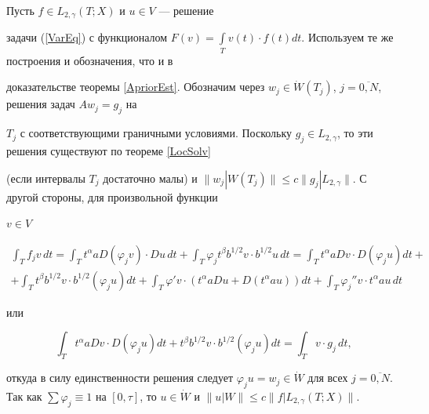 \begin{pf}


Пусть $f \in L_{2,\gamma}(T;X)$ и $u \in V$ --- решение


задачи (\ref{VarEq}) с функционалом $F(v)=\int\limits_T v(t) \cdot


f(t) dt$. Используем те же построения и обозначения, что и в


доказательстве теоремы \ref{ApriorEst}. Обозначим через $w_j \in


\dot{W}(T_j)$, $j=\overline{0,N}$, решения задач $A w_j=g_j$ на


$T_j$ с соответствующими граничными условиями. Поскольку $g_j \in


L_{2,\gamma}$, то эти решения существуют по теореме \ref{LocSolv}


(если интервалы $T_j$ достаточно малы) и $\|w_j|W(T_j)\| \le c


\|g_j|L_{2,\gamma}\|$. С другой стороны, для произвольной функции


$v \in V$


\begin{multline*}


\int_T f_j v\,dt = \int_T t^\alpha a D(\varphi_j v) \cdot Du\,dt  +


\int_T \varphi_j t^\beta b^{1/2} v \cdot b^{1/2} u\,dt


= \int_T t^\alpha a Dv \cdot D(\varphi_j u) dt +\\


%


+ \int_T t^\beta b^{1/2} v \cdot b^{1/2} (\varphi_j u) dt


+ \int_T \varphi' v \cdot (t^\alpha a Du + D(t^\alpha


au)) dt + \int_T  \varphi_j'' v \cdot t^\alpha au\,dt


\end{multline*}


или


$$


\int_T t^\alpha a D v \cdot D(\varphi_j u) dt  +


t^\beta b^{1/2} v \cdot b^{1/2} (\varphi_j u) dt = \int_T


v \cdot g_j\, dt,


$$


откуда в силу единственности решения следует $\varphi_j u=w_j


\in \Dot{W}$ для всех $j=\overline{0,N}$. Так как $\sum \varphi_j


\equiv 1$ на $[0,\tau]$, то $u \in \Dot{W}$ и $\|u|W\| \le c


\|f|L_{2,\gamma}(T;X)\|$.


\end{pf}








